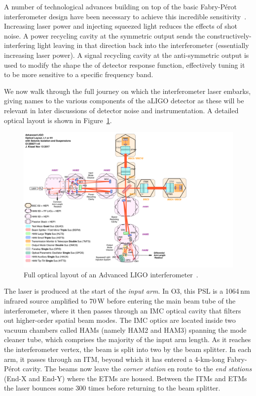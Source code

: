 A number of technological advances building on top of the basic Fabry-P\'erot interferometer design have been necessary to achieve this incredible sensitivity~\citep{aLIGO_design}.
Increasing laser power and injecting squeezed light reduces the effects of shot noise.
A power recycling cavity at the symmetric output sends the constructively-interfering light leaving in that direction back into the interferometer (essentially increasing laser power).
A signal recycling cavity at the anti-symmetric output is used to modify the shape the of detector response function, effectively tuning it to be more sensitive to a specific frequency band.

We now walk through the full journey on which the interferometer laser embarks, giving names to the various components of the aLIGO detector as these will be relevant in later discussions of detector noise and instrumentation.
A detailed optical layout is shown in Figure~\ref{fig:detectors-layout}.

\begin{figure}[htb]
  \centering
  \includegraphics[trim={0 0 9cm 0}, clip, width=\textwidth]{figures/detectors/layout.pdf}
  \caption{Full optical layout of an Advanced LIGO interferometer~\protect\citep{LIGO_layout_advanced}.}
  \label{fig:detectors-layout}
\end{figure}

The laser is produced at the start of the \textit{input arm}.
In O3, this \ac{PSL} is a 1064\,nm infrared source amplified to 70\,W before entering the main beam tube of the interferometer, where it then passes through an \ac{IMC} optical cavity that filters out higher-order spatial beam modes.
The \ac{IMC} optics are located inside two vacuum chambers called \acp{HAM} (namely HAM2 and HAM3) spanning the mode cleaner tube, which comprises the majority of the input arm length.
As it reaches the interferometer vertex, the beam is split into two by the beam splitter.
In each arm, it passes through an \ac{ITM}, beyond which it has entered a 4-km-long Fabry-P\'erot cavity.
The beams now leave the \textit{corner station} en route to the \textit{end stations} (End-X and End-Y) where the \acp{ETM} are housed.
Between the \acp{ITM} and \acp{ETM} the laser bounces some 300 times before returning to the beam splitter.

